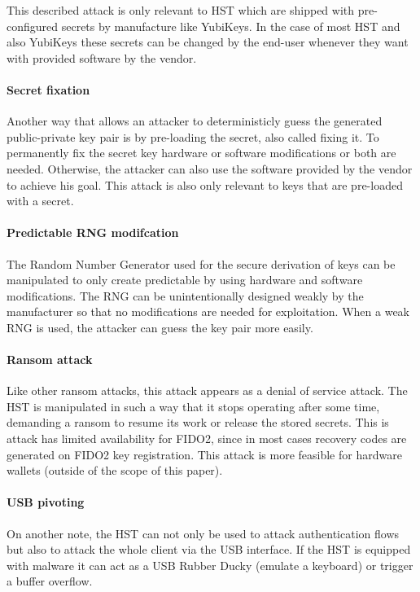 \documentclass[runningheads]{llncs}
\begin{document}
This described attack is only relevant to HST which are shipped with pre-configured secrets by manufacture like YubiKeys. In the case of most HST and also YubiKeys these secrets can be changed by the end-user whenever they want with provided software by the vendor.

\paragraph{Secret fixation}
Another way that allows an attacker to deterministicly guess the generated public-private key pair is by pre-loading the secret, also called fixing it. To permanently fix the secret key hardware or software modifications or both are needed. Otherwise, the attacker can also use the software provided by the vendor to achieve his goal. This attack is also only relevant to keys that are pre-loaded with a secret.

\paragraph{Predictable RNG modifcation}
The Random Number Generator used for the secure derivation of keys can be manipulated to only create predictable by using hardware and software modifications. The RNG can be unintentionally designed weakly by the manufacturer so that no modifications are needed for exploitation. When a weak RNG is used, the attacker can guess the key pair more easily.

\paragraph{Ransom attack}
Like other ransom attacks, this attack appears as a denial of service attack. The HST is manipulated in such a way that it stops operating after some time, demanding a ransom to resume its work or release the stored secrets. This is attack has limited availability for FIDO2, since in most cases recovery codes are generated on FIDO2 key registration. This attack is more feasible for hardware wallets (outside of the scope of this paper).

\paragraph{USB pivoting}
On another note, the HST can not only be used to attack authentication flows but also to attack the whole client via the USB interface. If the HST is equipped with malware it can act as a USB Rubber Ducky (emulate a keyboard) or trigger a buffer overflow.
\end{document}

